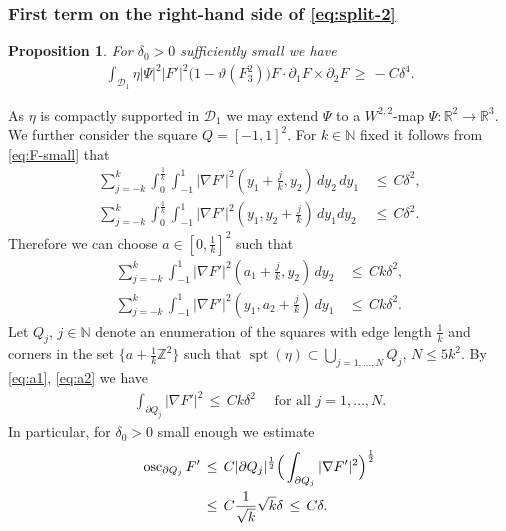 \documentclass[reqno,makeidx,12pt]{amsart}
\theoremstyle{note}
\newtheorem{proposition}{Proposition}
\theoremstyle{definition}
\begin{document}
\subsubsection{First term on the right-hand side of \eqref{eq:split-2}}
\begin{proposition}\label{prop:degree}
For $\delta_0>0$ sufficiently small we have
\begin{gather}
	\int_{{\mathcal{D}}_1} \eta |\Psi|^2 |F'|^2 \big(1-{\vartheta}(F_3^2)\big) F\cdot\partial_1 F \times \partial_2 F \,\geq\, -C\delta^4.
\end{gather}
\end{proposition}
As $\eta$ is compactly supported in ${\mathcal{D}}_1$ we may extend $\Psi$ to a $W^{2,2}$-map $\Psi:{\mathbb R}^2\to {\mathbb R}^3$. We further consider the square $Q=[-1,1]^2$. For $k\in{\ensuremath{\mathbb{N}}}$ fixed it follows from \eqref{eq:F-small} that 
\begin{align*}
	\sum_{j=-k}^k \int_0^{\frac{1}{k}}\int_{-1}^1 |\nabla F'|^2(y_1+\frac{j}{k},y_2)\,dy_2\,dy_1 \,&\leq\, {C}{}\delta^2, \\ 
	\sum_{j=-k}^k \int_0^{\frac{1}{k}}\int_{-1}^1 |\nabla F'|^2(y_1,y_2+\frac{j}{k})\,dy_1 dy_2\,&\leq\, {C}{}\delta^2. 
\end{align*}
Therefore we can choose $a\in [0,\frac{1}{k}]^2$ such that
\begin{align}
	\sum_{j=-k}^k \int_{-1}^1 |\nabla F'|^2(a_1+\frac{j}{k},y_2)\,dy_2 \,&\leq\, {C}{k}\delta^2, \label{eq:a1}\\ 
	\sum_{j=-k}^k \int_{-1}^1 |\nabla F'|^2(y_1,a_2+\frac{j}{k})\,dy_1 \,&\leq\, {C}{k}\delta^2. \label{eq:a2}
\end{align}
Let $Q_j$, $j\in{\ensuremath{\mathbb{N}}}$ denote an enumeration of the squares with edge length $\frac{1}{k}$ and corners in the set $\{a+\frac{1}{k}{\mathbb Z}^2\}$ such that $\operatorname{spt} (\eta)\subset \bigcup_{j=1,\dots,N} Q_j$, $N\leq 5k^2$. By \eqref{eq:a1}, \eqref{eq:a2} we have 
\begin{gather}
	\int_{\partial Q_j} |\nabla F'|^2 \,\leq\, Ck\delta^2\quad\text{ for all }j=1,\dots, N. \label{eq:a12}
\end{gather}
In particular, for $\delta_0>0$ small enough we estimate
\begin{align}
	\operatorname{osc}_{\partial Q_j} F' \,&\leq\, C|\partial Q_j|^{\frac{1}{2}} \Big(\int_{\partial Q_j} |\nabla F'|^2\Big)^\frac{1}{2} \notag\\
	&\leq\, C \frac{1}{\sqrt{k}}\sqrt{k}\delta\,\leq\, C\delta. \label{eq:osc}
\end{align}
\end{document}
